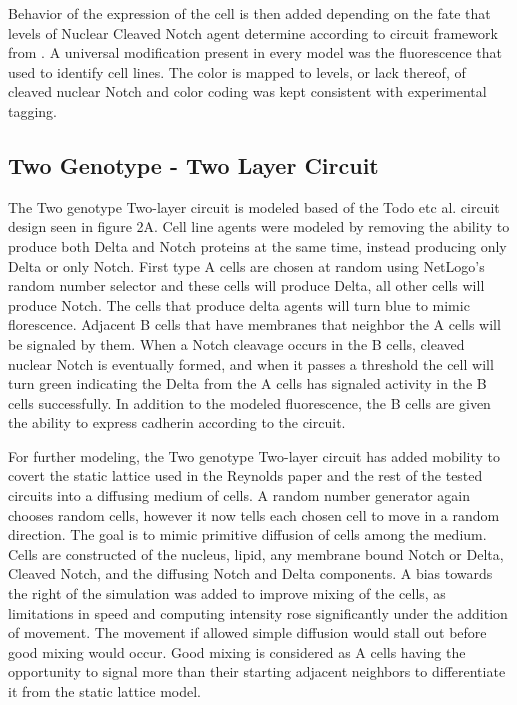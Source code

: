 \documentclass[12pt]{ifacconf}
\begin{document}
Behavior of the expression of the cell is then added depending on the fate that levels of Nuclear Cleaved Notch agent determine according to circuit framework from \cite{TP:18} . A universal modification present in every model was the fluorescence that \cite{TP:18} used to identify cell lines. The color is mapped to levels, or lack thereof, of cleaved nuclear Notch and color coding was kept consistent with \cite{TP:18} experimental tagging.

\subsection{Two Genotype - Two Layer Circuit}

The Two genotype Two-layer circuit is modeled based of the Todo etc al. circuit design seen in figure 2A. Cell line agents were modeled by removing the ability to produce both Delta and Notch proteins at the same time, instead producing only Delta or only Notch. First type A cells are chosen at random using NetLogo's random number selector and these cells will produce Delta, all other cells will produce Notch. The cells that produce delta agents will turn blue to mimic florescence. Adjacent B cells that have membranes that neighbor the A cells will be signaled by them. When a Notch cleavage occurs in the B cells, cleaved nuclear Notch is eventually formed, and when it passes a threshold the cell will turn green indicating the Delta from the A cells has signaled activity in the B cells successfully. In addition to the modeled fluorescence, the B cells are given the ability to express cadherin according to the circuit. 

For further modeling, the Two genotype Two-layer circuit has added mobility to covert the static lattice used in the Reynolds paper and the rest of the tested circuits into a diffusing medium of cells. A random number generator again chooses random cells, however it now tells each chosen cell to move in a random direction. The goal is to mimic primitive diffusion of cells among the medium. Cells are constructed of the nucleus, lipid, any membrane bound Notch or Delta, Cleaved Notch, and the diffusing Notch and Delta components. A bias towards the right of the simulation was added to improve mixing of the cells, as limitations in speed and computing intensity rose significantly under the addition of movement. The movement if allowed simple diffusion would stall out before good mixing would occur. Good mixing is considered as A cells having the opportunity to signal more than their starting adjacent neighbors to differentiate it from the static lattice model.
\end{document}
